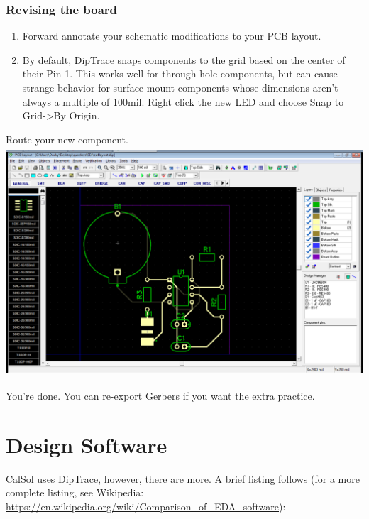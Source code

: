 \documentclass[letterpaper]{article}
\newcounter{saveenum}
\newcommand\liststyleRTFNumxi{%
\renewcommand\theenumi{\arabic{enumi}}
\renewcommand\theenumii{\alph{enumii}}
\renewcommand\theenumiii{\roman{enumiii}}
\renewcommand\theenumiv{\arabic{enumiv}}
\renewcommand\labelenumi{\theenumi.}
\renewcommand\labelenumii{\theenumii.}
\renewcommand\labelenumiii{\theenumiii.}
\renewcommand\labelenumiv{\theenumiv.}
}
\begin{document}
\subsubsection{Revising the board}
\hypertarget{Toc337742706}{}\liststyleRTFNumxi
\setcounter{saveenum}{\value{enumi}}
\begin{enumerate}
\setcounter{enumi}{\value{saveenum}}
\item {\sffamily\color[rgb]{0.30980393,0.5058824,0.7411765}
Forward annotate your schematic modifications to your PCB layout.}
\item {\sffamily\color[rgb]{0.30980393,0.5058824,0.7411765}
By default, DipTrace snaps components to the grid based on the center of their Pin 1. This works well for through-hole
components, but can cause strange behavior for surface-mount components whose dimensions aren't always a multiple of
100mil. Right click the new LED and choose Snap to Grid-{\textgreater}By Origin.}
\end{enumerate}
{\sffamily\color[rgb]{0.30980393,0.5058824,0.7411765}
Route your new component.\newline
 \includegraphics[width=5.4in,height=3.3665in]{figures/ee4document-img050.png} }

{\sffamily\color[rgb]{0.30980393,0.5058824,0.7411765}
You're done. You can re-export Gerbers if you want the extra practice.}

\section{Design Software}
\hypertarget{Toc337742707}{}{\sffamily\color[rgb]{0.30980393,0.5058824,0.7411765}
CalSol uses DipTrace, however, there are more. A brief listing follows (for a more complete listing, see Wikipedia:
\url{https://en.wikipedia.org/wiki/Comparison_of_EDA_software}):}
\end{document}
